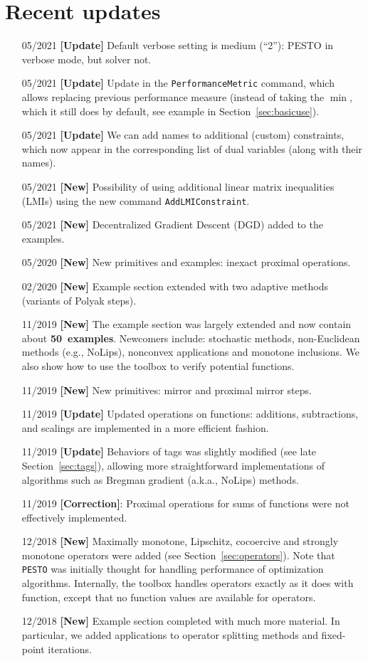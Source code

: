 \documentclass[11pt,a4paper]{article}
\begin{document}
	\section*{Recent updates}
	\begin{itemize}
		\item[05/2021] {\bf{}[Update]} Default verbose setting is medium (``2''): PESTO in verbose mode, but solver not.
		\item[05/2021] {\bf{}[Update]} Update in the \verb|PerformanceMetric| command, which allows replacing previous performance measure (instead of taking the $\min$, which it still does by default, see example in Section~\ref{sec:basicuse}).
		\item[05/2021] {\bf{}[Update]} We can add names to additional (custom) constraints, which now appear in the corresponding list of dual variables (along with their names).
		\item[05/2021] {\bf{}[New]} Possibility of using additional linear matrix inequalities (LMIs) using the new command \verb?AddLMIConstraint?.
		\item[05/2021] {\bf{}[New]} Decentralized Gradient Descent (DGD) added to the examples.
		\item[05/2020] {\bf{}[New]} New primitives and examples: inexact proximal operations.
		\item[02/2020] {\bf{}[New]} Example section extended with two adaptive methods (variants of Polyak steps).
		\item[11/2019] {\bf{}[New]} The example section was largely extended and now contain about {\bf 50~examples}. Newcomers include:  stochastic methods, non-Euclidean methods (e.g., NoLips), nonconvex applications and monotone inclusions. We also show how to use the toolbox to verify potential functions.
		\item[11/2019] {\bf{}[New]} New primitives: mirror and proximal mirror steps.
		\item[11/2019] {\bf{}[Update]} Updated operations on functions: additions, subtractions, and scalings are implemented in a more efficient fashion.
		\item[11/2019] {\bf{}[Update]} Behaviors of tags was slightly modified (see late Section~\ref{sec:tags}), allowing more straightforward implementations of algorithms such as Bregman gradient (a.k.a., NoLips) methods.
		\item[11/2019] {\bf{}[Correction]}: Proximal operations for sums of functions were not effectively implemented.
		\item[12/2018] {\bf{}[New]} Maximally monotone, Lipschitz, cocoercive and strongly monotone operators were added (see Section~\ref{sec:operators}). Note that \verb|PESTO| was initially thought for handling performance of optimization algorithms. Internally, the toolbox handles operators exactly as it does with function, except that no function values are available for operators.
		\item[12/2018] {\bf{}[New]} Example section completed with much more material. In particular, we added applications to operator splitting methods and fixed-point iterations.
	\end{itemize}
	
\end{document}
